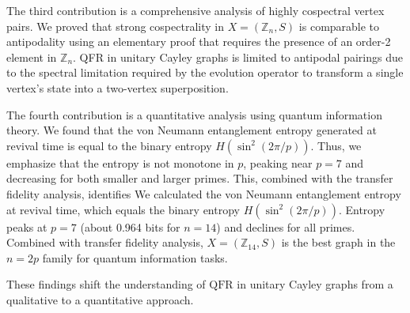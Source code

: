 \documentclass[12pt]{amsart}
\newcommand{\QFR}{\mathrm{QFR}}
\begin{document}
The third contribution is a comprehensive analysis of highly cospectral vertex pairs.
We proved that strong cospectrality in $X = (\mathbb{Z}_n, S)$ is comparable to antipodality using an elementary proof that requires the presence of an order-2 element in $\mathbb{Z}_n$. QFR in unitary Cayley graphs is limited to antipodal pairings due to the spectral limitation required by the evolution operator to transform a single vertex's state into a two-vertex superposition.

The fourth contribution is a quantitative analysis using quantum information theory. We found that the von Neumann entanglement entropy generated at revival time is equal to the binary entropy $H(\sin^2(2\pi/p))$. Thus, we emphasize that the entropy is not monotone in $p$, peaking near $p = 7$ and decreasing for both smaller and larger primes. This, combined with the transfer fidelity analysis, identifies We calculated the von Neumann entanglement entropy at revival time, which equals the binary entropy $H(\sin^2(2\pi/p))$. Entropy peaks at $p = 7$ (about 0.964 bits for $n = 14$) and declines for all primes. Combined with transfer fidelity analysis, $X = (\mathbb{Z}_{14}, S)$ is the best graph in the $n = 2p$ family for quantum information tasks.

These findings shift the understanding of $\QFR$ in unitary Cayley graphs from a qualitative to a quantitative approach.




\end{document}
